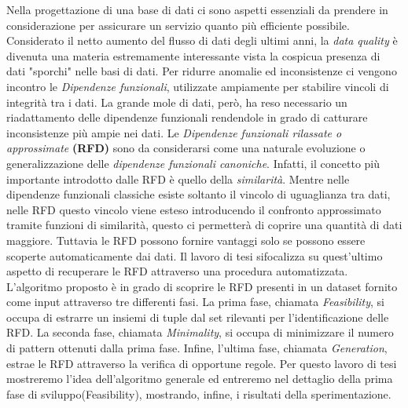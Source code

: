 Nella progettazione di una base di dati ci sono aspetti essenziali da prendere in considerazione per assicurare un servizio quanto più efficiente possibile.
Considerato il netto aumento del flusso di dati degli ultimi anni,  la \emph{data quality} è divenuta una materia estremamente interessante vista la cospicua presenza di dati "sporchi" nelle basi di dati.
Per ridurre anomalie ed inconsistenze ci vengono incontro le \emph{Dipendenze funzionali}, utilizzate ampiamente per stabilire vincoli di integrità tra i dati.
La grande mole di dati, però, ha reso necessario un riadattamento delle dipendenze funzionali rendendole in grado di catturare inconsistenze più ampie nei dati. 
Le \emph{Dipendenze funzionali rilassate o approssimate} \textbf{(RFD)} sono da considerarsi come una naturale evoluzione o generalizzazione delle \emph{dipendenze funzionali canoniche}. Infatti,
il concetto più importante introdotto dalle RFD è quello della \emph{similarità}.
Mentre nelle dipendenze funzionali classiche esiste soltanto il vincolo di uguaglianza tra dati, nelle RFD questo vincolo viene esteso introducendo il confronto approssimato tramite funzioni di similarità, questo ci permetterà di coprire una quantità di dati maggiore.
Tuttavia le RFD possono fornire vantaggi solo se possono essere scoperte automaticamente dai dati.
Il lavoro di tesi sifocalizza su quest'ultimo aspetto di recuperare le RFD attraverso una procedura automatizzata.
L'algoritmo proposto è in grado di scoprire le RFD presenti in un dataset fornito come input attraverso tre differenti fasi. La prima fase, chiamata \emph{Feasibility}, si occupa di estrarre un insiemi di tuple dal set rilevanti per l'identificazione delle RFD. La seconda fase, chiamata \emph{Minimality}, si occupa di minimizzare il numero di pattern ottenuti dalla prima fase. Infine, l'ultima fase, chiamata \emph{Generation}, estrae le RFD attraverso la verifica di opportune regole.
Per questo lavoro di tesi mostreremo l'idea dell'algoritmo generale ed entreremo nel dettaglio della prima fase di sviluppo(Feasibility), mostrando, infine, i risultati della sperimentazione.